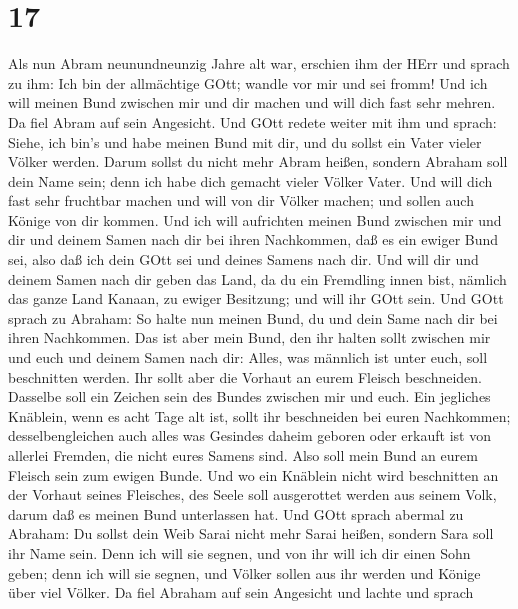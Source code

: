 \hypertarget{section-16}{%
\section{17}\label{section-16}}

 Als nun Abram neunundneunzig Jahre alt war, erschien ihm
der HErr und sprach zu ihm: Ich bin der allmächtige GOtt; wandle vor mir
und sei fromm!  Und ich will meinen Bund zwischen mir und
dir machen und will dich fast sehr mehren.  Da fiel Abram
auf sein Angesicht. Und GOtt redete weiter mit ihm und sprach:
 Siehe, ich bin's und habe meinen Bund mit dir, und du
sollst ein Vater vieler Völker werden.  Darum sollst du
nicht mehr Abram heißen, sondern Abraham soll dein Name sein; denn ich
habe dich gemacht vieler Völker Vater.  Und will dich fast
sehr fruchtbar machen und will von dir Völker machen; und sollen auch
Könige von dir kommen.  Und ich will aufrichten meinen Bund
zwischen mir und dir und deinem Samen nach dir bei ihren Nachkommen, daß
es ein ewiger Bund sei, also daß ich dein GOtt sei und deines Samens
nach dir.  Und will dir und deinem Samen nach dir geben das
Land, da du ein Fremdling innen bist, nämlich das ganze Land Kanaan, zu
ewiger Besitzung; und will ihr GOtt sein.  Und GOtt sprach
zu Abraham: So halte nun meinen Bund, du und dein Same nach dir bei
ihren Nachkommen.  Das ist aber mein Bund, den ihr halten
sollt zwischen mir und euch und deinem Samen nach dir: Alles, was
männlich ist unter euch, soll beschnitten werden.  Ihr
sollt aber die Vorhaut an eurem Fleisch beschneiden. Dasselbe soll ein
Zeichen sein des Bundes zwischen mir und euch.  Ein
jegliches Knäblein, wenn es acht Tage alt ist, sollt ihr beschneiden bei
euren Nachkommen; desselbengleichen auch alles was Gesindes daheim
geboren oder erkauft ist von allerlei Fremden, die nicht eures Samens
sind.  Also soll mein Bund an eurem Fleisch sein zum ewigen
Bunde.  Und wo ein Knäblein nicht wird beschnitten an der
Vorhaut seines Fleisches, des Seele soll ausgerottet werden aus seinem
Volk, darum daß es meinen Bund unterlassen hat.  Und GOtt
sprach abermal zu Abraham: Du sollst dein Weib Sarai nicht mehr Sarai
heißen, sondern Sara soll ihr Name sein.  Denn ich will sie
segnen, und von ihr will ich dir einen Sohn geben; denn ich will sie
segnen, und Völker sollen aus ihr werden und Könige über viel Völker.
 Da fiel Abraham auf sein Angesicht und lachte und sprach

